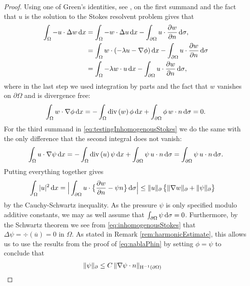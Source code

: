 \begin{proof}
  Using one of Green's identities, see \cite[Thm. 3, App. C.2]{evans}, on the first summand and the fact that $u$ is the solution to the Stokes resolvent problem gives that
  \begin{align*}
    \int_\Omega -u \cdot \Delta w \, {\operatorname{d}\!{x}}
    &= \int_\Omega -w \cdot \Delta u \, {\operatorname{d}\!{x}} - \int_{\partial\Omega} u \cdot \frac{\partial w}{\partial n} \, {\operatorname{d}\!{\sigma}}, \\
    &= \int_\Omega w \cdot ( -\lambda u - \nabla \phi) \, {\operatorname{d}\!{x}} - \int_{\partial\Omega} u \cdot \frac{\partial w}{\partial n} \, {\operatorname{d}\!{\sigma}} \\
    &= \int_\Omega -\lambda w \cdot u \, {\operatorname{d}\!{x}} - \int_{\partial\Omega} u \cdot \frac{\partial w}{\partial n} \, {\operatorname{d}\!{\sigma}}, 
  \end{align*}
  where in the last step we used integration by parts and the fact that $w$ vanishes on $\partial\Omega$ and is divergence free:
  \begin{align*}
    \int_\Omega w \cdot \nabla\phi \, {\operatorname{d}\!{x}} = -\int_\Omega \mathrm{div\,} (w) \, \phi \, {\operatorname{d}\!{x}} + \int_{\partial\Omega} \phi \, w \cdot n \, {\operatorname{d}\!{\sigma}} = 0.
  \end{align*}
  For the third summand in \eqref{eq:testingInhomogenousStokes} we do the same with the only difference that the second integral does not vanish:
  \begin{align*}
    \int_\Omega u \cdot \nabla\psi \, {\operatorname{d}\!{x}} 
    = -\int_\Omega \mathrm{div\,} (u)\, \psi \, {\operatorname{d}\!{x}} + \int_{\partial\Omega} \psi \, u \cdot n \, {\operatorname{d}\!{\sigma}} 
    = \int_{\partial\Omega} \psi \, u \cdot n \, {\operatorname{d}\!{\sigma}}.
  \end{align*}
  Putting everything together gives
  \begin{align}
    \int_\Omega |u|^2 \, {\operatorname{d}\!{x}} 
    &= \Big| \int_{\partial\Omega} u \cdot \big\{ \frac{\partial w}{\partial n} - \psi n \big\} \, {\operatorname{d}\!{\sigma}} \Big|
    \leq \| u\|_\partial \, \big\{ \|\nabla w\|_\partial + \|\psi\|_\partial \big\} \label{eq:u2estimate}
  \end{align}
  by the Cauchy-Schwartz inequality.
  As the pressure $\psi$ is only specified modulo additive constants, we may as well assume that $\int_{\partial\Omega} \psi \, {\operatorname{d}\!{\sigma}} = 0$.
  Furthermore, by the Schwartz theorem we see from \eqref{eq:inhomogenousStokes} that $\Delta \psi = \div(\overline u) = 0$ in $\Omega$. 
  As stated in Remark \ref{rem:harmonicEstimate}, this allows us to use the results from the proof of \eqref{eq:nablaPhin} by setting $\phi = \psi$ to conclude that
  \begin{align}
    \|\psi\|_\partial 
    &\leq C\, \| \nabla \psi \cdot n\|_{\HH^{-1}(\partial\Omega)} \nonumber

\end{align}
\end{proof}
